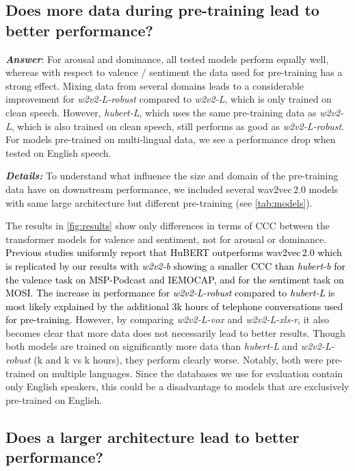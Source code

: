 \documentclass{article}
\newcommand\wbase{\mbox{\emph{w2v2-b}}}
\newcommand\hbase{\mbox{\emph{hubert-b}}}
\newcommand\wlarge{\mbox{\emph{w2v2-L}}}
\newcommand\hlarge{\mbox{\emph{hubert-L}}}
\newcommand\wrobust{\mbox{\emph{w2v2-L-robust}}}
\newcommand\wvox{\mbox{\emph{w2v2-L-vox}}}
\newcommand\wxlsr{\mbox{\emph{w2v2-L-xls-r}}}
\newcommand{\review}[1]{\textcolor{black}{#1}}
\newcommand\msppodcast{\mbox{MSP-Podcast}}
\newcommand\iemocap{\mbox{IEMOCAP}}
\newcommand\mosi{\mbox{MOSI}}
\newcommand{\wtov}{wav2vec\,2.0}
\newcommand{\hubert}{HuBERT}
\begin{document}
\subsection{Does more data during pre-training lead to better performance?}
\label{subsec:influence_data}

\emph{\textbf{Answer}}:
For arousal and dominance,
all tested models perform equally well,
whereas with respect to valence / sentiment the data used for pre-training has a strong effect.
Mixing data from several domains leads to a considerable improvement for {\wrobust}
compared to {\wlarge},
which is only trained on clean speech.
However, {\hlarge}, 
which uses the same pre-training data as {\wlarge},
which is also trained on clean speech,
still performs as good as {\wrobust}.
For models pre-trained on multi-lingual data,
we see a performance drop when tested on English speech.

\noindent
\emph{\textbf{Details:}}
To understand
what influence the size and domain of the pre-training data
have on downstream performance,
we included several {\wtov} models
with same large architecture but different pre-training (see \cref{tab:models}). 

The results in \cref{fig:results} show only differences
in terms of \ac{CCC} between the transformer models
for valence and sentiment,
not for arousal or dominance.
\review{Previous studies uniformly report 
that {\hubert} outperforms {\wtov}
which is replicated by our results 
with {\wbase} showing a smaller CCC than {\hbase}
for the valence task on {\msppodcast} and {\iemocap}, 
and for the sentiment task on {\mosi}. 
The increase in performance 
for {\wrobust} 
compared to {\hlarge} 
is most likely explained 
by the additional 3k hours of telephone conversations 
used for pre-training.}
However, by comparing {\wvox} and {\wxlsr},
it also becomes clear
that more data does not necessarily lead to better results. 
Though both models are trained on significantly more data
than {\hlarge} and {\wrobust} (k and k vs k hours),
they perform clearly worse.
Notably, both were pre-trained on multiple languages. 
Since the databases we use for evaluation contain only English speakers,
this could be a disadvantage to models that are exclusively pre-trained on English.




\subsection{Does a larger architecture lead to better performance?}
\label{subsec:larger_architecture}
\end{document}

